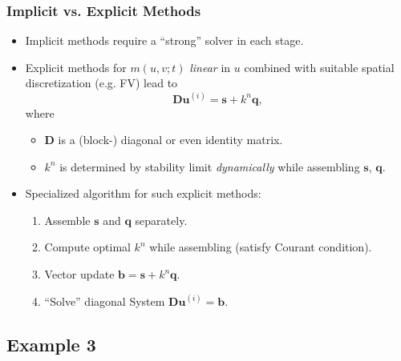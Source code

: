 \begin{frame}
\frametitle{Implicit vs. Explicit Methods}
\begin{itemize}
\item Implicit methods require a ``strong'' solver in each stage.
\item Explicit methods for $m(u,v;t)$ \textit{linear} in $u$ combined with
suitable spatial discretization (e.g. FV) lead to
\begin{equation*}
\mathbf{D} \mathbf{u}^{(i)} = \mathbf{s} + k^n \mathbf{q},
\end{equation*} 
where 
\begin{itemize}
\item $\mathbf{D}$ is a (block-) diagonal or even identity matrix.
\item $k^n$ is determined by stability limit \textit{dynamically} while 
assembling $\mathbf{s}$, $\mathbf{q}$.
\end{itemize}
\item Specialized algorithm for such explicit methods:
\begin{enumerate}
\item Assemble $\mathbf{s}$ and $\mathbf{q}$ separately.
\item Compute optimal $k^n$ while assembling (satisfy Courant condition).
\item Vector update $\mathbf{b} = \mathbf{s} + k^n \mathbf{q}$.
\item ``Solve'' diagonal System $\mathbf{D} \mathbf{u}^{(i)} = \mathbf{b}$.
\end{enumerate}
\end{itemize}
\end{frame}


\subsection{Example 3}

